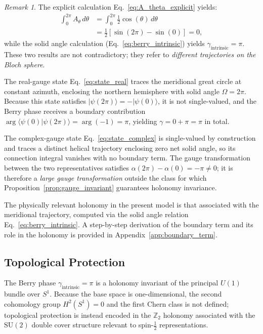 \documentclass[%
 reprint,
 amsmath,amssymb,
 aps,
 prb,
]{revtex4-2}
\numberwithin{equation}{section}
\theoremstyle{definition}
\theoremstyle{remark}
\newtheorem{remark}{Remark}[section]
\newcommand{\Sone}{S^1}
\newcommand{\Uone}{U(1)}
\begin{document}
\begin{remark}
The explicit calculation Eq.~\eqref{eq:A_theta_explicit} yields:
\begin{equation}
\begin{split}
\int_0^{2\pi} A_\theta\,d\theta
&= \int_0^{2\pi} \frac{1}{2}\cos(\theta)\,d\theta \\
&= \frac{1}{2}[\sin(2\pi) - \sin(0)] = 0,
\end{split}
\label{eq:connection_integral}
\end{equation}
while the solid angle calculation (Eq.~\ref{eq:berry_intrinsic}) yields
$\gamma_{\text{intrinsic}} = \pi$.
These two results are not contradictory; they refer to
\emph{different trajectories on the Bloch sphere}.

The real-gauge state Eq.~\eqref{eq:state_real} traces the meridional
great circle at constant azimuth, enclosing the northern hemisphere
with solid angle $\Omega = 2\pi$.
Because this state satisfies $|\psi(2\pi)\rangle = -|\psi(0)\rangle$,
it is not single-valued, and the Berry phase receives a boundary
contribution $\arg\langle\psi(0)|\psi(2\pi)\rangle = \arg(-1) = \pi$,
yielding $\gamma = 0 + \pi = \pi$ in total.

The complex-gauge state Eq.~\eqref{eq:state_complex} is single-valued
by construction and traces a distinct helical trajectory enclosing zero
net solid angle, so its connection integral vanishes with no boundary term.
The gauge transformation between the two representatives satisfies
$\alpha(2\pi) - \alpha(0) = -\pi \neq 0$; it is therefore a
\emph{large gauge transformation} outside the class for which
Proposition~\ref{prop:gauge_invariant} guarantees holonomy invariance.

The physically relevant holonomy in the present model is that
associated with the meridional trajectory, computed via the solid
angle relation Eq.~\eqref{eq:berry_intrinsic}.
A step-by-step derivation of the boundary term and its role in the
holonomy is provided in Appendix~\ref{app:boundary_term}.
\end{remark}

\subsection{Topological Protection}

The Berry phase $\gamma_{\text{intrinsic}} = \pi$ is a holonomy invariant of the principal $\Uone$ bundle over $\Sone$. Because the base space is one-dimensional, the second cohomology group $H^2(\Sone) = 0$ and the first Chern class is not defined; topological protection is instead encoded in the $\mathbb{Z}_2$ holonomy associated with the $\mathrm{SU}(2)$ double cover structure relevant to spin-$\tfrac{1}{2}$ representations.
\end{document}

